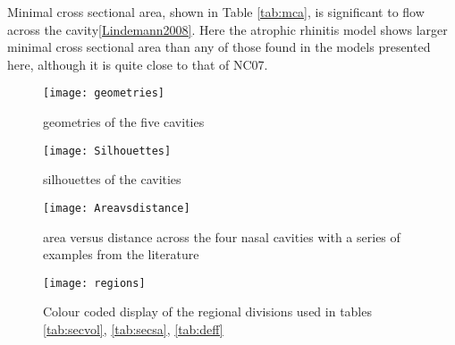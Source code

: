 Minimal cross sectional area, shown in Table \ref{tab:mca}, is significant to flow across the cavity\ref{Lindemann2008}. Here the atrophic rhinitis model shows larger minimal cross sectional area than any of those found in the models presented here, although it is quite close to that of NC07.


\begin{figure} \label{fig:geo}
  \texttt{[image: geometries]}
  \caption{geometries of the five cavities}
\end{figure}

\begin{figure} \label{fig:sil}
  \texttt{[image: Silhouettes]}
  \caption{silhouettes of the cavities}
\end{figure}

\begin{figure} \label{fig:area}
  \texttt{[image: Areavsdistance]}
  \caption{area versus distance across the four nasal cavities with a series of examples from the literature}
\end{figure}

\begin{figure}
\centering
\texttt{[image: regions]}
\caption{Colour coded display of the regional divisions used in tables \ref{tab:secvol}, \ref{tab:secsa}, \ref{tab:deff}} \label{fig:regions}
\end{figure}

